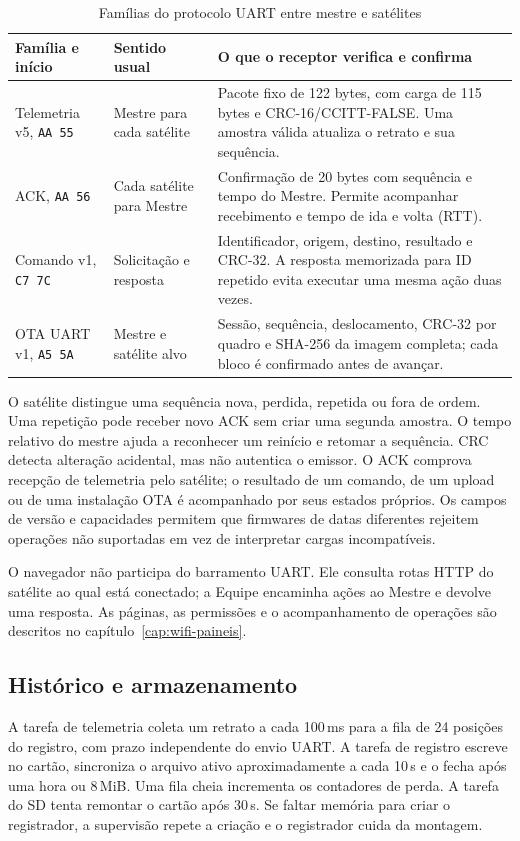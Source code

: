 \begin{table}[htbp]\centering\small
\caption{Famílias do protocolo UART entre mestre e satélites}\label{tab:familias}
\begin{tabularx}{\textwidth}{@{}p{2.6cm}p{2.4cm}X@{}}\toprule
Família e início & Sentido usual & O que o receptor verifica e confirma\\\midrule
Telemetria v5, \texttt{AA 55} & Mestre para cada satélite & Pacote fixo de 122 bytes, com carga de 115 bytes e CRC-16/CCITT-FALSE. Uma amostra válida atualiza o retrato e sua sequência.\\
ACK, \texttt{AA 56} & Cada satélite para Mestre & Confirmação de 20 bytes com sequência e tempo do Mestre. Permite acompanhar recebimento e tempo de ida e volta (RTT).\\
Comando v1, \texttt{C7 7C} & Solicitação e resposta & Identificador, origem, destino, resultado e CRC-32. A resposta memorizada para ID repetido evita executar uma mesma ação duas vezes.\\
OTA UART v1, \texttt{A5 5A} & Mestre e satélite alvo & Sessão, sequência, deslocamento, CRC-32 por quadro e SHA-256 da imagem completa; cada bloco é confirmado antes de avançar.\\\bottomrule
\end{tabularx}\end{table}

O satélite distingue uma sequência nova, perdida, repetida ou fora de ordem. Uma repetição pode receber novo ACK sem criar uma segunda amostra. O tempo relativo do mestre ajuda a reconhecer um reinício e retomar a sequência. CRC detecta alteração acidental, mas não autentica o emissor. O ACK comprova recepção de telemetria pelo satélite; o resultado de um comando, de um upload ou de uma instalação OTA é acompanhado por seus estados próprios. Os campos de versão e capacidades permitem que firmwares de datas diferentes rejeitem operações não suportadas em vez de interpretar cargas incompatíveis.

O navegador não participa do barramento UART. Ele consulta rotas HTTP do satélite ao qual está conectado; a Equipe encaminha ações ao Mestre e devolve uma resposta. As páginas, as permissões e o acompanhamento de operações são descritos no capítulo~\ref{cap:wifi-paineis}.

\subsection{Histórico e armazenamento}
A tarefa de telemetria coleta um retrato a cada 100\,ms para a fila de 24 posições do registro, com prazo independente do envio UART. A tarefa de registro escreve no cartão, sincroniza o arquivo ativo aproximadamente a cada 10\,s e o fecha após uma hora ou 8\,MiB. Uma fila cheia incrementa os contadores de perda. A tarefa do SD tenta remontar o cartão após 30\,s. Se faltar memória para criar o registrador, a supervisão repete a criação e o registrador cuida da montagem.

